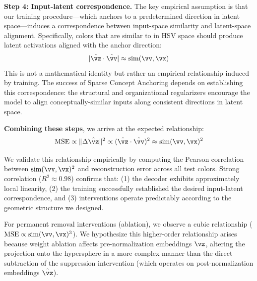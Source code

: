 \textbf{Step 4: Input-latent correspondence.} The key empirical assumption is that our training procedure---which anchors  to a predetermined direction in latent space---induces a correspondence between input-space similarity and latent-space alignment. Specifically, colors that are similar to  in HSV space should produce latent activations aligned with the  anchor direction:
\begin{equation}
    |\hat{\vz} \cdot \hat{\vv}| \approx \text{sim}(\vv, \vx)
\end{equation}
This is not a mathematical identity but rather an empirical relationship induced by training. The success of Sparse Concept Anchoring depends on establishing this correspondence: the structural and organizational regularizers encourage the model to align conceptually-similar inputs along consistent directions in latent space.

\textbf{Combining these steps}, we arrive at the expected relationship:
\begin{equation}
    \text{MSE} \propto \|\Delta \hat{\vz}\|^2 \propto (\hat{\vz} \cdot \hat{\vv})^2 \approx \text{sim}(\vv, \vx)^2
\end{equation}

We validate this relationship empirically by computing the Pearson correlation between $\text{sim}(\vv, \vx)^2$ and reconstruction error across all test colors. Strong correlation ($R^2 \approx 0.98$) confirms that: (1) the decoder exhibits approximately local linearity, (2) the training successfully established the desired input-latent correspondence, and (3) interventions operate predictably according to the geometric structure we designed.

For permanent removal interventions (ablation), we observe a cubic relationship ($\text{MSE} \propto \text{sim}(\vv, \vx)^3$). We hypothesize this higher-order relationship arises because weight ablation affects pre-normalization embeddings $\vz$, altering the projection onto the hypersphere in a more complex manner than the direct subtraction of the suppression intervention (which operates on post-normalization embeddings $\hat{\vz}$).

